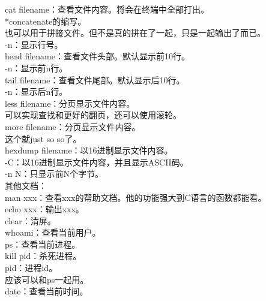 \documentclass{article}
\begin{document}
\noindent
cat filename：查看文件内容。将会在终端中全部打出。\\
\hspace*{2em} *concatenate的缩写。\\
\hspace*{2em} 也可以用于拼接文件。但不是真的拼在了一起，只是一起输出了而已。\\
\hspace*{2em} -n：显示行号。\\

\noindent
head filename：查看文件头部。默认显示前10行。\\
\hspace*{2em} -n：显示前n行。\\

\noindent
tail filename：查看文件尾部。默认显示后10行。\\
\hspace*{2em} -n：显示后n行。\\

\noindent
less filename：分页显示文件内容。\\
\hspace*{2em} 可以实现查找和更好的翻页，还可以使用滚轮。\\

\noindent
more filename：分页显示文件内容。\\
\hspace*{2em} 这个就just so so了。\\

\noindent
hexdump filename：以16进制显示文件内容。\\
\hspace*{2em} -C：以16进制显示文件内容，并且显示ASCII码。\\
\hspace*{2em} -n N：只显示前N个字节。\\

\noindent
其他文档：\\
man xxx：查看xxx的帮助文档。他的功能强大到C语言的函数都能看。\\
echo xxx：输出xxx。\\

\noindent
clear：清屏。\\
whoami：查看当前用户。\\
ps：查看当前进程。\\
kill pid：杀死进程。\\
\hspace*{2em} pid：进程id。\\
\hspace*{2em} 应该可以和ps一起用。\\
date：查看当前时间。\\
\end{document}
